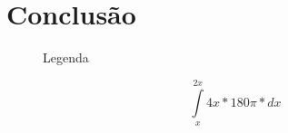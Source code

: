 \section{Conclusão}
\lipsum[1]
\begin{center}
	\begin{figure}[h]
		\caption{Legenda}
		\label{fig:placeholder.jpg}
	\end{figure}
	\begin{equation}
	\int\limits_{x}^{2x} 4x*180\pi*dx
	\end{equation}
\end{center}